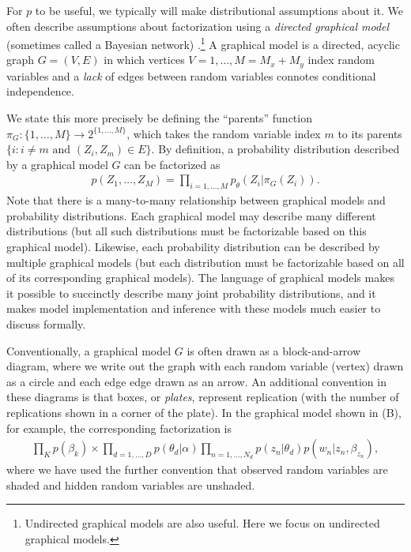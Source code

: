 For $p$ to be useful, we typically will make distributional
assumptions about it.  We often describe assumptions about
factorization using a \emph{directed graphical model} (sometimes
called a Bayesian network) \citep{pearl:1985}.\footnote{Undirected
  graphical models are also useful.  Here we focus on undirected
  graphical models.}  A graphical model is a directed, acyclic graph
$G = (V, E)$ in which vertices $V=1, \ldots, M = M_x + M_y$ index
random variables and a \emph{lack} of edges between random variables
connotes conditional independence.

We state this more precisely be defining the ``parents'' function
$\pi_G : \{ 1, \ldots, M \} \rightarrow 2^{\{ 1, \ldots, M \}}$, which
takes the random variable index $m$ to its parents $\{ i : i \neq m
\mbox{ and } (Z_i, Z_m) \in E \}$.  By definition, a probability
distribution described by a graphical model $G$ can be factorized as
\begin{align}
  p(Z_1, \ldots, Z_M) = \prod_{i=1, \ldots, M} p_\theta(Z_i | \pi_G(Z_i) ).
\end{align}
Note that there is a many-to-many relationship between graphical
models and probability distributions. Each graphical model may
describe many different distributions (but all such distributions must
be factorizable based on this graphical model).  Likewise, each
probability distribution can be described by multiple graphical
models (but each distribution must be factorizable based on all of its
corresponding graphical models). The language of graphical
models makes it possible to succinctly describe many joint probability
distributions, and it makes model implementation and inference with
these models much easier to discuss formally.

Conventionally, a graphical model $G$ is often drawn as a
block-and-arrow diagram, where we write out the graph with each random
variable (vertex) drawn as a circle and each edge edge drawn as an
arrow.  An additional convention in these diagrams is that boxes, or
\emph{plates}, represent replication (with the number of replications
shown in a corner of the plate). In the graphical model shown in
 (B), for example, the corresponding
factorization is
\begin{align}
  \prod_K p(\beta_k) \times \prod_{d=1,\ldots,D} p(\theta_d | \alpha) \prod_{n=1,\ldots,N_d} p(z_n | \theta_d) p(w_n | z_n, \beta_{z_n}),
\end{align}
where we have used the further convention that observed random
variables are shaded and hidden random variables are unshaded.

